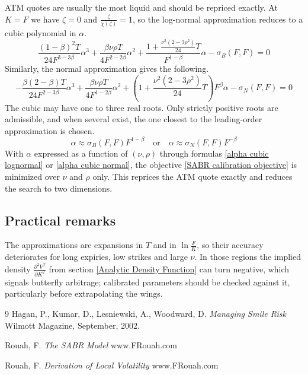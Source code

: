 \documentclass{article}
\begin{document}
ATM quotes are usually the most liquid and should be repriced exactly.
At $ K = F $ we have $ \zeta = 0 $ and $ \frac{\zeta}{\chi(\zeta)} = 1 $, so the log-normal approximation reduces to a cubic polynomial in $ \alpha $.
\begin{equation} \label{alpha cubic lognormal}
    \frac{\left(1 - \beta\right)^2 T}{24 F^{3 - 3 \beta}} \alpha^3 + \frac{\beta \nu \rho T}{4 F^{2 - 2 \beta}} \alpha^2 + \frac{1 + \frac{\nu^2 \left(2 - 3 \rho^2\right)}{24} T}{F^{1 - \beta}} \alpha - \sigma_B\left(F, F\right) = 0
\end{equation}
Similarly, the normal approximation gives the following.
\begin{equation} \label{alpha cubic normal}
    -\frac{\beta \left(2 - \beta\right) T}{24 F^{2 - 3 \beta}} \alpha^3 + \frac{\beta \nu \rho T}{4 F^{1 - 2 \beta}} \alpha^2 + \left(1 + \frac{\nu^2 \left(2 - 3 \rho^2\right)}{24} T\right) F^{\beta} \alpha - \sigma_N\left(F, F\right) = 0
\end{equation}
The cubic may have one to three real roots.
Only strictly positive roots are admissible, and when several exist, the one closest to the leading-order approximation is chosen.
\begin{equation}
    \alpha \approx \sigma_B\left(F, F\right) F^{1 - \beta} \quad \text{or} \quad \alpha \approx \sigma_N\left(F, F\right) F^{-\beta}
\end{equation}
With $ \alpha $ expressed as a function of $ \left(\nu, \rho\right) $ through formulas \ref{alpha cubic lognormal} or \ref{alpha cubic normal}, the objective \ref{SABR calibration objective} is minimized over $ \nu $ and $ \rho $ only.
This reprices the ATM quote exactly and reduces the search to two dimensions.

\subsection{Practical remarks}

The approximations are expansions in $ T $ and in $ \ln{\frac{F}{K}} $, so their accuracy deteriorates for long expiries, low strikes and large $ \nu $.
In those regions the implied density $ \frac{\partial^2 V^T}{\partial K^2} $ from section \ref{Analytic Density Function} can turn negative, which signals butterfly arbitrage; calibrated parameters should be checked against it, particularly before extrapolating the wings.


\begin{thebibliography}{9}
    Hagan, P., Kumar, D., Lesniewski, A., Woodward, D.
    \textit{Managing Smile Risk}
    Wilmott Magazine, September, 2002.
    
    Rouah, F.
    \textit{The SABR Model}
    www.FRouah.com
    
    Rouah, F.
    \textit{Derivation of Local Volatility}
    www.FRouah.com
\end{thebibliography}
\end{document}
